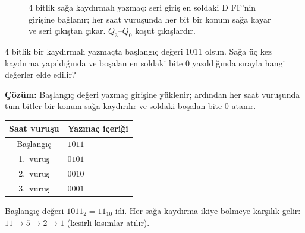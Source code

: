 \begin{figure}[H]
\centering
{}
\caption[4 bitlik sağa kaydırmalı yazmaç]{4 bitlik sağa kaydırmalı yazmaç: seri giriş en soldaki D FF'nin girişine bağlanır; her saat vuruşunda her bit bir konum sağa kayar ve seri çıkıştan çıkar. $Q_3$--$Q_0$ koşut çıkışlardır.}
\label{fig:kaydirmali-yazmac}
\end{figure}

\begin{ornek}[B.14]
4 bitlik bir kaydırmalı yazmaçta başlangıç değeri $1011$ olsun. Sağa üç kez kaydırma yapıldığında ve boşalan en soldaki bite 0 yazıldığında sırayla hangi değerler elde edilir?

\textbf{Çözüm:}
Başlangıç değeri yazmaç girişine yüklenir; ardından her saat vuruşunda tüm bitler bir konum sağa kaydırılır ve soldaki boşalan bite 0 atanır.

\begin{table}[H]
\centering
\begin{tabular}{cl}
\toprule
\textbf{Saat vuruşu} & \textbf{Yazmaç içeriği} \\
\midrule
Başlangıç & $1011$ \\
1.~vuruş   & $0101$ \\
2.~vuruş   & $0010$ \\
3.~vuruş   & $0001$ \\
\bottomrule
\end{tabular}
\end{table}

Başlangıç değeri $1011_2 = 11_{10}$ idi. Her sağa kaydırma ikiye bölmeye karşılık gelir: $11 \to 5 \to 2 \to 1$ (kesirli kısımlar atılır).
\end{ornek}



